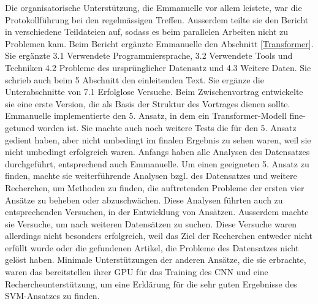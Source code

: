 Die organisatorische Unterstützung, die Emmanuelle vor allem leistete, war die Protokollführung bei den regelmässigen Treffen. Ausserdem teilte sie den Bericht in verschiedene Teildateien auf, sodass es beim parallelen Arbeiten nicht zu Problemen kam.
Beim Bericht ergänzte Emmanuelle den Abschnitt \ref{Transformer}. Sie ergänzte 3.1 Verwendete Programmiersprache, 3.2 Verwendete Tools und Techniken 4.2 Probleme des ursprünglicher Datensatz und 4.3 Weitere Daten. Sie schrieb auch beim 5 Abschnitt den einleitenden Text. Sie ergänze die Unterabschnitte von 7.1 Erfolglose Versuche.
Beim Zwischenvortrag entwickelte sie eine erste Version, die als Basis der Struktur des Vortrages dienen sollte. 
Emmanuelle implementierte den 5. Ansatz, in dem ein Transformer-Modell fine-getuned worden ist. Sie machte auch noch weitere Tests die für den 5. Ansatz gedient haben, aber nicht umbedingt im finalen Ergebnis zu sehen waren, weil sie nicht umbedingt erfolgreich waren.
Anfangs haben alle Analysen des Datensatzes durchgeführt, entsprechend auch Emmanuelle. Um einen geeigneten 5. Ansatz zu finden, machte sie weiterführende Analysen bzgl. des Datensatzes und weitere Recherchen, um Methoden zu finden, die auftretenden Probleme der ersten vier Ansätze zu beheben oder abzuschwächen. Diese Analysen führten auch zu entsprechenden Versuchen, in der Entwicklung von Ansätzen.
Ausserdem machte sie Versuche, um nach weiteren Datensätzen zu suchen. %
Diese Versuche waren allerdings nicht besonders erfolgreich, weil das Ziel der Recherchen entweder nicht erfüllt wurde oder die gefundenen Artikel, die Probleme des Datensatzes nicht gelöst haben. 
Minimale Unterstützungen der anderen Ansätze, die sie erbrachte, waren das bereitstellen ihrer GPU für das Training des CNN und eine Rechercheunterstützung, um eine Erklärung für die sehr guten Ergebnisse des SVM-Ansatzes zu finden.